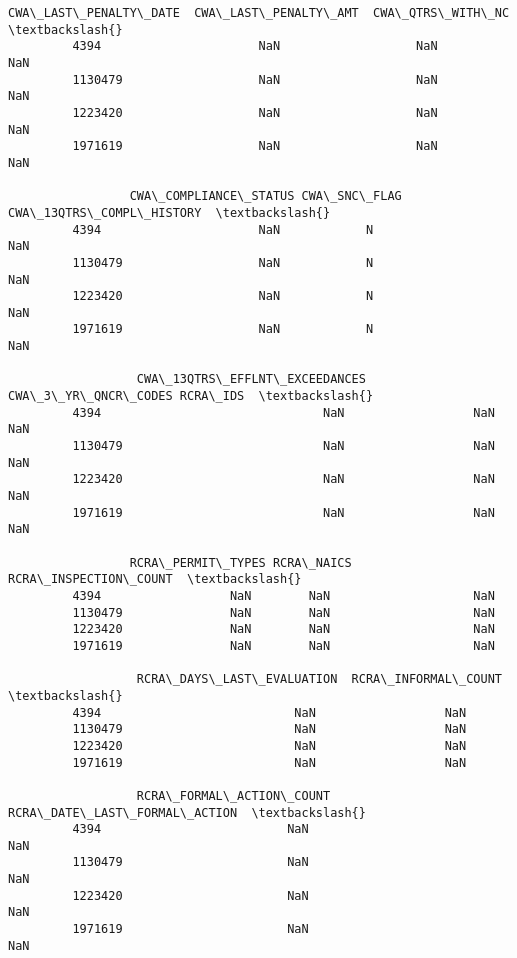 \documentclass[11pt]{article}
\begin{document}
\begin{Verbatim}[commandchars=\\\{\}]
                 CWA\_LAST\_PENALTY\_DATE  CWA\_LAST\_PENALTY\_AMT  CWA\_QTRS\_WITH\_NC  \textbackslash{}
         4394                      NaN                   NaN               NaN   
         1130479                   NaN                   NaN               NaN   
         1223420                   NaN                   NaN               NaN   
         1971619                   NaN                   NaN               NaN   
         
                 CWA\_COMPLIANCE\_STATUS CWA\_SNC\_FLAG CWA\_13QTRS\_COMPL\_HISTORY  \textbackslash{}
         4394                      NaN            N                      NaN   
         1130479                   NaN            N                      NaN   
         1223420                   NaN            N                      NaN   
         1971619                   NaN            N                      NaN   
         
                  CWA\_13QTRS\_EFFLNT\_EXCEEDANCES  CWA\_3\_YR\_QNCR\_CODES RCRA\_IDS  \textbackslash{}
         4394                               NaN                  NaN      NaN   
         1130479                            NaN                  NaN      NaN   
         1223420                            NaN                  NaN      NaN   
         1971619                            NaN                  NaN      NaN   
         
                 RCRA\_PERMIT\_TYPES RCRA\_NAICS  RCRA\_INSPECTION\_COUNT  \textbackslash{}
         4394                  NaN        NaN                    NaN   
         1130479               NaN        NaN                    NaN   
         1223420               NaN        NaN                    NaN   
         1971619               NaN        NaN                    NaN   
         
                  RCRA\_DAYS\_LAST\_EVALUATION  RCRA\_INFORMAL\_COUNT  \textbackslash{}
         4394                           NaN                  NaN   
         1130479                        NaN                  NaN   
         1223420                        NaN                  NaN   
         1971619                        NaN                  NaN   
         
                  RCRA\_FORMAL\_ACTION\_COUNT RCRA\_DATE\_LAST\_FORMAL\_ACTION  \textbackslash{}
         4394                          NaN                          NaN   
         1130479                       NaN                          NaN   
         1223420                       NaN                          NaN   
         1971619                       NaN                          NaN   
         

\end{Verbatim}
\end{document}

